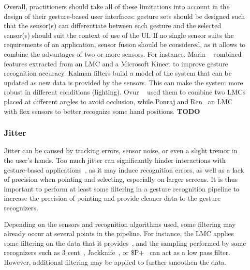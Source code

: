 Overall, practitioners should take all of these limitations into account in the design of their gesture-based user interfaces: gesture sets should be designed such that the sensor(s) can differentiate between each gesture and the selected sensor(s) should suit the context of use of the UI. 
If no single sensor suits the requirements of an application, sensor fusion should be considered, as it allows to combine the advantages of two or more sensors. 
%
For instance, Marin \etal~\cite{Marin:2014} combined features extracted from an LMC and a Microsoft Kinect to improve gesture recognition accuracy. 
%
Kalman filters build a model of the system that can be updated as new data is provided by the sensors. This can make the system more robust in different conditions (\eg lighting). Ovur \etal~\cite{Ovur:2021} used them to combine two LMCs placed at different angles to avoid occlusion, while Ponraj and Ren~\cite{Ponraj:2018} an LMC with flex sensors to better recognize some hand positions. \textbf{TODO}
%


\subsubsection{Jitter} \label{sec:state_of_the_art:overview:challenges:jitter}
\label{sec:noise}
Jitter can be caused by tracking errors, sensor noise, or even a slight tremor in the user's hands. Too much jitter can significantly hinder interactions with gesture-based applications~\cite{Pavlovych:2009}, as it may induce recognition errors, as well as a lack of precision when pointing and selecting, especially on larger screens. It is thus important to perform at least some filtering in a gesture recognition pipeline to increase the precision of pointing and provide cleaner data to the gesture recognizers.

Depending on the sensors and recognition algorithms used, some filtering may already occur at several points in the pipeline. For instance, the LMC applies some filtering on the data that it provides~\cite{Colgan:2017}, and the sampling performed by some recognizers such as 3 cent~\cite{Caputo:2017}, Jackknife~\cite{Taranta:2017}, or \$P+~\cite{Vatavu:2017a} can act as a low pass filter. However, additional filtering may be applied to further smoothen the data.

